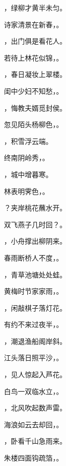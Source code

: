 \documentclass[12pt, a4paper, addpoints, answers]{exam}
\begin{document}
\begin{questions}
\question[3] ，绿柳才黄半未匀。

\question[3] 诗家清景在新春，。

\question[3] ，出门俱是看花人。

\question[3] 若待上林花似锦，。

\question[3] ，春日凝妆上翠楼。

\question[3] 闺中少妇不知愁，。

\question[3] ，悔教夫婿觅封侯。

\question[3] 忽见陌头杨柳色，。

\question[3] ，积雪浮云端。

\question[3] 终南阴岭秀，。

\question[3] ，城中增暮寒。

\question[3] 林表明霁色，。

\question[3] ？夹岸桃花蘸水开。

\question[3] 双飞燕子几时回？。

\question[3] ，小舟撑出柳阴来。

\question[3] 春雨断桥人不度，。

\question[3] ，青草池塘处处蛙。

\question[3] 黄梅时节家家雨，。

\question[3] ，闲敲棋子落灯花。

\question[3] 有约不来过夜半，。

\question[3] ，潮退渔船阁岸斜。

\question[3] 江头落日照平沙，。

\question[3] ，见人惊起入芦花。

\question[3] 白鸟一双临水立，。

\question[3] ，北风吹起数声雷。

\question[3] 海浪如云去却回，。

\question[3] ，卧看千山急雨来。

\question[3] 朱楼四面钩疏箔，。


\end{questions}
\end{document}
